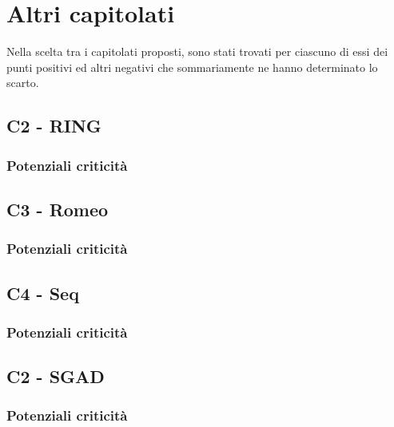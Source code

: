 \section{Altri capitolati}
Nella scelta tra i capitolati proposti, sono stati trovati per ciascuno di essi dei punti positivi ed altri negativi che sommariamente ne hanno determinato lo scarto.

\subsection{C2 - RING}
	
	\subsubsection{Potenziali criticità}
	
\subsection{C3 - Romeo}

	\subsubsection{Potenziali criticità}
	
\subsection{C4 - Seq}

	\subsubsection{Potenziali criticità}
	
\subsection{C2 - SGAD}

	\subsubsection{Potenziali criticità}